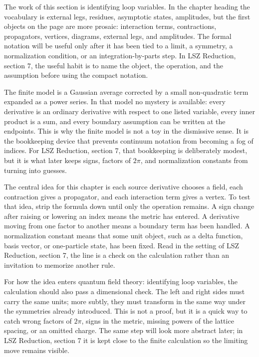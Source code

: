 The work of this section is identifying loop variables.  In the chapter heading the vocabulary is external legs, residues, asymptotic states, amplitudes, but the first objects on the page are more prosaic: interaction terms, contractions, propagators, vertices, diagrams, external legs, and amplitudes.  The formal notation will be useful only after it has been tied to a limit, a symmetry, a normalization condition, or an integration-by-parts step.  In LSZ Reduction, section 7, the useful habit is to name the object, the operation, and the assumption before using the compact notation.

The finite model is a Gaussian average corrected by a small non-quadratic term expanded as a power series.  In that model no mystery is available: every derivative is an ordinary derivative with respect to one listed variable, every inner product is a sum, and every boundary assumption can be written at the endpoints.  This is why the finite model is not a toy in the dismissive sense.  It is the bookkeeping device that prevents continuum notation from becoming a fog of indices.  For LSZ Reduction, section 7, that bookkeeping is deliberately modest, but it is what later keeps signs, factors of \(2\pi\), and normalization constants from turning into guesses.

The central idea for this chapter is each source derivative chooses a field, each contraction gives a propagator, and each interaction term gives a vertex.  To test that idea, strip the formula down until only the operation remains.  A sign change after raising or lowering an index means the metric has entered.  A derivative moving from one factor to another means a boundary term has been handled.  A normalization constant means that some unit object, such as a delta function, basis vector, or one-particle state, has been fixed.  Read in the setting of LSZ Reduction, section 7, the line is a check on the calculation rather than an invitation to memorize another rule.

For how the idea enters quantum field theory: identifying loop variables, the calculation should also pass a dimensional check.  The left and right sides must carry the same units; more subtly, they must transform in the same way under the symmetries already introduced.  This is not a proof, but it is a quick way to catch wrong factors of \(2\pi\), signs in the metric, missing powers of the lattice spacing, or an omitted charge.  The same step will look more abstract later; in LSZ Reduction, section 7 it is kept close to the finite calculation so the limiting move remains visible.

